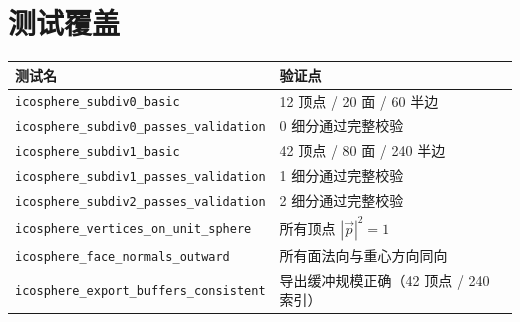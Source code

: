 \documentclass[11pt,a4paper]{article}
\begin{document}
\section{测试覆盖}

\begin{center}
\renewcommand{\arraystretch}{1.18}
\begin{tabular}{@{}ll@{}}
  \toprule
  \textbf{测试名} & \textbf{验证点} \\
  \midrule
  \texttt{icosphere\_subdiv0\_basic}            & 12 顶点 / 20 面 / 60 半边 \\
  \texttt{icosphere\_subdiv0\_passes\_validation} & 0 细分通过完整校验 \\
  \texttt{icosphere\_subdiv1\_basic}            & 42 顶点 / 80 面 / 240 半边 \\
  \texttt{icosphere\_subdiv1\_passes\_validation} & 1 细分通过完整校验 \\
  \texttt{icosphere\_subdiv2\_passes\_validation} & 2 细分通过完整校验 \\
  \texttt{icosphere\_vertices\_on\_unit\_sphere} & 所有顶点 $|\vec{p}|^2 = 1$ \\
  \texttt{icosphere\_face\_normals\_outward}    & 所有面法向与重心方向同向 \\
  \texttt{icosphere\_export\_buffers\_consistent} & 导出缓冲规模正确（42 顶点 / 240 索引） \\
  \bottomrule
\end{tabular}
\end{center}
\end{document}
